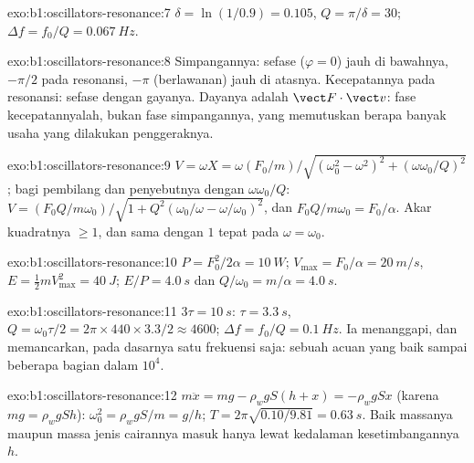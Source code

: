 \begin{solution}{exo:b1:oscillators-resonance:7}
$\delta = \ln(1/0.9) = 0.105$, $Q = \pi/\delta = 30$; $\Delta f = f_0/Q =
\qty{0.067}{Hz}$.
\end{solution}

\begin{solution}{exo:b1:oscillators-resonance:8}
Simpangannya: sefase ($\varphi = 0$) jauh di bawahnya, $-\pi/2$ pada
resonansi, $-\pi$ (berlawanan) jauh di atasnya. Kecepatannya pada
resonansi: sefase dengan gayanya. Dayanya adalah $\vect F\cdot\vect v$:
fase kecepatannyalah, bukan fase simpangannya, yang memutuskan berapa
banyak usaha yang dilakukan penggeraknya.
\end{solution}

\begin{solution}{exo:b1:oscillators-resonance:9}
$V = \omega X = \omega(F_0/m)/\sqrt{(\omega_0^2 - \omega^2)^2 + (\omega\omega_0/Q)^2}$;
bagi pembilang dan penyebutnya dengan $\omega\omega_0/Q$: $V = (F_0Q/m\omega_0)/
\sqrt{1 + Q^2(\omega_0/\omega - \omega/\omega_0)^2}$, dan $F_0Q/m\omega_0 = F_0/\alpha$.
Akar kuadratnya $\geq 1$, dan sama dengan $1$ tepat pada $\omega = \omega_0$.
\end{solution}

\begin{solution}{exo:b1:oscillators-resonance:10}
$P = F_0^2/2\alpha = \qty{10}{W}$; $V_{\max} = F_0/\alpha = \qty{20}{m/s}$,
$E = \tfrac12 mV_{\max}^2 = \qty{40}{J}$; $E/P = \qty{4.0}{s}$ dan $Q/\omega_0 =
m/\alpha = \qty{4.0}{s}$.
\end{solution}

\begin{solution}{exo:b1:oscillators-resonance:11}
$3\tau = \qty{10}{s}$: $\tau = \qty{3.3}{s}$, $Q = \omega_0\tau/2 = 2\pi \times
440 \times 3.3/2 \approx 4600$; $\Delta f = f_0/Q = \qty{0.1}{Hz}$. Ia
menanggapi, dan memancarkan, pada dasarnya satu frekuensi saja: sebuah
acuan yang baik sampai beberapa bagian dalam $10^4$.
\end{solution}

\begin{solution}{exo:b1:oscillators-resonance:12}
$m\ddot x = mg - \rho_wgS(h + x) = -\rho_wgSx$ (karena $mg = \rho_wgSh$):
$\omega_0^2 = \rho_wgS/m = g/h$; $T = 2\pi\sqrt{0.10/9.81} = \qty{0.63}{s}$.
Baik massanya maupun massa jenis cairannya masuk hanya lewat kedalaman
kesetimbangannya $h$.
\end{solution}

